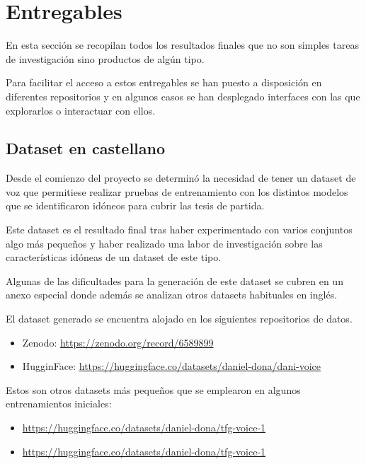 \section{Entregables}
\label{Entregables}

En esta sección se recopilan todos los resultados finales que no son simples tareas de investigación sino productos de algún tipo.

Para facilitar el acceso a estos entregables se han puesto a disposición en diferentes repositorios y en algunos casos se han desplegado interfaces con las que explorarlos o interactuar con ellos.

\subsection{Dataset en castellano}

Desde el comienzo del proyecto se determinó la necesidad de tener un dataset de voz que permitiese realizar pruebas de entrenamiento con los distintos modelos que se identificaron idóneos para cubrir las tesis de partida.

Este dataset es el resultado final tras haber experimentado con varios conjuntos algo más pequeños y haber realizado una labor de investigación sobre las características idóneas de un dataset de este tipo.

Algunas de las dificultades para la generación de este dataset se cubren en un anexo especial donde además se analizan otros datasets habituales en inglés.

El dataset generado se encuentra alojado en los siguientes repositorios de datos.

\begin{itemize}
    \item Zenodo: \url{https://zenodo.org/record/6589899}
    \item HugginFace: \url{https://huggingface.co/datasets/daniel-dona/dani-voice}
    
\end{itemize}

Estos son otros datasets más pequeños que se emplearon en algunos entrenamientos iniciales:

\begin{itemize}
    \item \url{https://huggingface.co/datasets/daniel-dona/tfg-voice-1}
    \item \url{https://huggingface.co/datasets/daniel-dona/tfg-voice-1}

\end{itemize}

